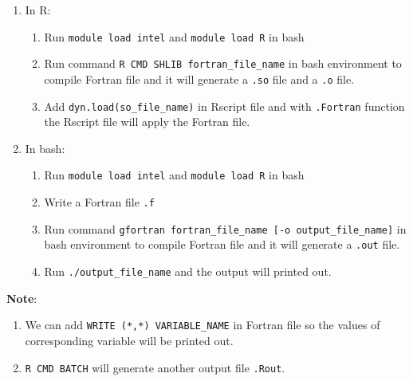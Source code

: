 \documentclass[12pt]{article}
\begin{document}
\begin{enumerate}[label={(\arabic*)}]
	\item In R:
	\begin{enumerate}[label={(\roman*)}]
		\item Run \verb|module load intel| and \verb|module load R| in bash
		\item Run command \verb|R CMD SHLIB fortran_file_name| in bash environment to compile Fortran file and it will generate a \verb|.so| file and a \verb|.o| file.
		\item Add \verb|dyn.load(so_file_name)| in Rscript file and with \verb|.Fortran| function the Rscript file will apply the Fortran file.
	\end{enumerate} 
	\item In bash:
	\begin{enumerate}[label={(\roman*)}]
		\item Run \verb|module load intel| and \verb|module load R| in bash
		\item Write a Fortran file \verb|.f|
		\item Run command \verb|gfortran fortran_file_name [-o output_file_name]| in bash environment to compile Fortran file and it will generate a \verb|.out| file.
		\item Run \verb|./output_file_name| and the output will printed out.
	\end{enumerate} 

\end{enumerate}

\textbf{Note}: 

\begin{enumerate}[label = {(\alph*)}]
	\item  We can add \verb|WRITE (*,*) VARIABLE_NAME| in Fortran file so the values of corresponding variable will be printed out.
	\item \verb|R CMD BATCH| will generate another output file \verb|.Rout|.
\end{enumerate}
\end{document}
